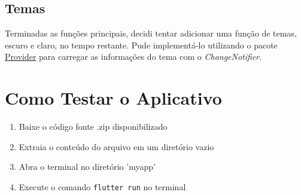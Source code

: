 \documentclass[a4paper,12pt]{article}
\begin{document}
\subsection{Temas}
Terminadas as funções principais, decidi tentar adicionar uma função de temas, escuro e claro, no tempo restante. Pude implementá-lo utilizando o pacote \href{https://pub.dev/packages/provider}{Provider} para carregar as informações do tema com o \textit{ChangeNotifier}.
\section{Como Testar o Aplicativo}
\begin{enumerate}
\item Baixe o código fonte .zip disponibilizado
\item Extraia o conteúdo do arquivo em um diretório vazio
\item Abra o terminal no diretório 'myapp'
\item Execute o comando \lstinline{flutter run} no terminal
\end{enumerate}
\end{document}
